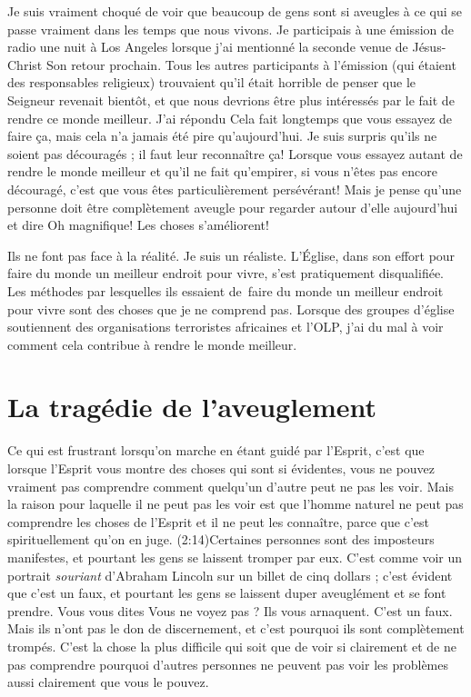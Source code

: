 Je suis vraiment choqué de voir que beaucoup de gens sont si aveugles à ce qui se passe
 vraiment dans les temps que nous vivons. Je participais à une émission de radio
 une nuit à Los Angeles lorsque j'ai mentionné la seconde venue
 de Jésus-Christ \ocadr Son retour prochain.
 Tous les autres participants à l'émission
 (qui étaient des responsables religieux) trouvaient qu'il était horrible
 de penser que le Seigneur revenait bientôt, et que nous devrions être plus
 intéressés par le fait de rendre ce monde meilleur. J'ai répondu\frcolon{}
 \Og Cela fait longtemps que vous essayez de faire ça, mais cela n'a jamais
 été pire qu'aujourd'hui. \Fg{}
 Je suis surpris qu'ils ne soient pas découragés ;
 il faut leur reconnaître ça!
 Lorsque vous essayez autant de rendre le monde meilleur et qu'il ne fait
 qu'empirer, si vous n'êtes pas encore découragé, c'est que vous êtes
 particulièrement persévérant!
 Mais je pense qu'une personne doit être complètement aveugle pour regarder
 autour d'elle aujourd'hui et dire\frcolon{}
 \Og Oh magnifique! Les choses s'améliorent! \Fg{}

Ils ne font pas face à la réalité. Je suis un réaliste.
 L'Église, dans son effort pour faire du monde un meilleur endroit
 pour vivre, s'est pratiquement disqualifiée.
 Les méthodes par lesquelles ils essaient de~faire du monde un meilleur
 endroit pour vivre sont des choses que je ne comprend pas.
 Lorsque des groupes d'église soutiennent des organisations terroristes
 africaines et l'OLP,
 j'ai du mal à voir comment cela contribue à rendre le monde meilleur.

\section{La trag\'edie de l'aveuglement}

Ce qui est frustrant lorsqu'on marche en étant guidé par l'Esprit,
 c'est que lorsque l'Esprit vous montre des choses qui sont si évidentes,
 vous ne pouvez vraiment pas comprendre comment quelqu'un d'autre
 peut ne pas les voir. Mais la raison pour laquelle il ne peut pas les voir
 est que l'homme naturel ne peut pas comprendre les choses de l'Esprit\frcolon{}
 \Og [\dots{}] et il ne peut les connaître, parce que c'est spirituellement
 qu'on en juge. \Fg{}
 (2:14)Certaines personnes sont des imposteurs manifestes,
 et pourtant les gens se laissent tromper par eux.
 C'est comme voir un portrait \emph{souriant} d'Abraham Lincoln
 sur un billet de cinq dollars ; c'est évident que c'est un faux,
 et pourtant les gens se laissent duper aveuglément et se font prendre.
 Vous vous dites\frcolon{} \Og Vous ne voyez pas ? Ils vous arnaquent.
 C'est un faux. \Fg{}
 Mais ils n'ont pas le don de discernement, et c'est pourquoi ils sont
 complètement trompés.
 C'est la chose la plus difficile qui soit que de voir si clairement
 et de ne pas comprendre pourquoi d'autres personnes ne peuvent
 pas voir les problèmes aussi clairement que vous le pouvez.

